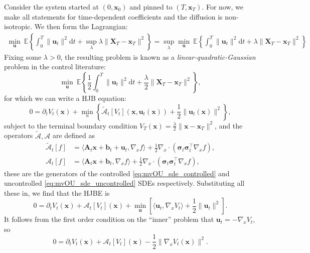 \documentclass{article}
\newcommand{\diff}{\mathrm{d}}
\newcommand{\E}{\mathbb{E}}
\newcommand{\Ac}{\mathcal{A}}
\theoremstyle{newstyle}
\begin{document}
Consider the system started at $(0, \bm{x}_0)$ and pinned to $(T, \bm{x}_T)$. For now, we make all statements for time-dependent coefficients and the diffusion is non-isotropic. We then form the Lagrangian:
\begin{align*}
  \min_{\bm{u}} \: \E\left\{ \int_0^T \| \bm{u}_t \|^2 \diff t + \sup_{\lambda} \lambda \| \bm{X}_T - \bm{x}_T \|^2 \right\} = \sup_\lambda \min_{\bm{u}} \: \E\left\{ \int_0^T \| \bm{u}_t \|^2 \diff t + \lambda \| \bm{X}_T - \bm{x}_T \|^2 \right\}
\end{align*}
Fixing some $\lambda > 0$, the resulting problem is known as a \emph{linear-quadratic-Gaussian} problem \cite{lindquist1973feedback} in the control literature:
\begin{equation}
  \min_{\bm{u}} \: \E\left\{ \frac{1}{2} \int_0^T \| \bm{u}_t \|^2 \diff t + \frac{\lambda}{2} \| \bm{X}_T - \bm{x}_T \|^2 \right\}, 
\end{equation}
for which we can write a HJB equation:
\begin{equation}
  0 = \partial_t V_t(\bm{x}) + \min_u \left\{ \widetilde{\mathcal{A}}_t[V_t](\bm{x}, \bm{u}_t(\bm{x})) + \frac{1}{2} \| \bm{u}_t(\bm{x}) \|^2 \right\},
\end{equation}
subject to the terminal boundary condition $V_T(\bm{x}) = \frac{\lambda}{2} \| \bm{x} - \bm{x}_T \|^2$, and the operators $\widetilde{\Ac}, \Ac$ are defined as 
\begin{align}
  \widetilde{\mathcal{A}}_t[f] &= \langle \bm{A}_t \bm{x} + \bm{b}_t + \bm{u}_t, \nabla_x f \rangle + \frac{1}{2} \nabla_x \cdot (\bm{\sigma}_t \bm{\sigma}_t^\top \nabla_x f), \\ 
  \mathcal{A}_t[f] &= \langle \bm{A}_t \bm{x} + \bm{b}_t, \nabla_x f \rangle + \frac{1}{2} \nabla_x \cdot (\bm{\sigma}_t \bm{\sigma}_t^\top \nabla_x f), 
\end{align}
these are the generators of the controlled \eqref{eq:mvOU_sde_controlled} and uncontrolled \eqref{eq:mvOU_sde_uncontrolled} SDEs respectively. 
Substituting all these in, we find that the HJBE is 
\begin{equation}
  0 = \partial_t V_t(\bm{x}) + \mathcal{A}_t[V_t](\bm{x}) + \min_{\bm{u}} \left[ \langle \bm{u}_t, \nabla_x V_t \rangle + \frac{1}{2} \| \bm{u}_t \|^2 \right]. 
\end{equation}
It follows from the first order condition on the ``inner'' problem that $\bm{u}_t = -\nabla_x V_t$, so
\begin{equation}
  0 = \partial_t V_t(\bm{x}) + \mathcal{A}_t[V_t](\bm{x}) - \frac{1}{2} \| \nabla_x V_t(\bm{x}) \|^2. 
\end{equation}
\end{document}
